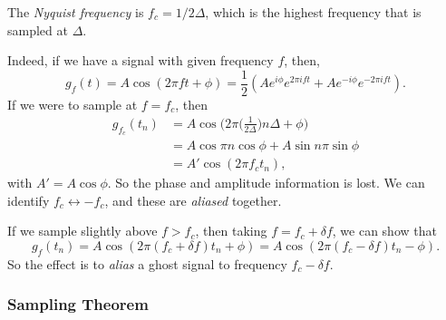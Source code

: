 \documentclass[12pt]{article}
\begin{document}
The \textit{Nyquist frequency} is $f_c = 1/2\Delta$, which is the highest frequency that is sampled at $\Delta$.

Indeed, if we have a signal with given frequency $f$, then,
\[
	g_f(t) = A \cos(2 \pi f t + \phi) = \frac{1}{2}(Ae^{i \phi}e^{2 \pi i ft} + Ae^{- i \phi}e^{-2 \pi i ft})
.\]
If we were to sample at $f = f_c$, then
\begin{align*}
	g_{f_c}(t_n) &= A \cos \biggl(2 \pi \biggl( \frac{1}{2 \Delta} \biggr) n \Delta + \phi \biggr) \\
		     &= A \cos \pi n \cos \phi + A \sin n \pi \sin \phi \\
		     &= A' \cos (2 \pi f_c t_n),
\end{align*}
with $A' = A \cos \phi$. So the phase and amplitude information is lost. We can identify $f_c \leftrightarrow -f_c$, and these are \textit{aliased} together.

If we sample slightly above $f > f_c$, then taking $f = f_c + \delta f$, we can show that
\[
	g_f(t_n) = A \cos (2 \pi (f_c + \delta f)t_n + \phi) = A \cos (2 \pi (f_c - \delta f)t_n - \phi)
.\]
So the effect is to \textit{alias} a ghost signal to frequency $f_c - \delta f$.

\subsubsection{Sampling Theorem}%
\label{subsub:sampling_theorem}
\end{document}
